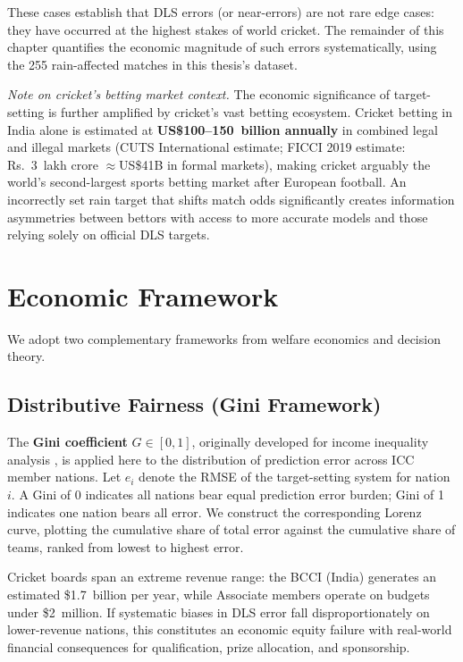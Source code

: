 \documentclass[12pt,a4paper,oneside]{report}
\begin{document}
\medskip
These cases establish that DLS errors (or near-errors) are not rare edge cases: they have occurred at the highest stakes of world cricket.  The remainder of this chapter quantifies the economic magnitude of such errors systematically, using the 255 rain-affected matches in this thesis's dataset.

\medskip
\noindent\textit{Note on cricket's betting market context.}  The economic significance of target-setting is further amplified by cricket's vast betting ecosystem.  Cricket betting in India alone is estimated at \textbf{US\$100--150~billion annually} in combined legal and illegal markets (CUTS International estimate; FICCI 2019 estimate: Rs.\ 3~lakh crore $\approx$US\$41B in formal markets), making cricket arguably the world's second-largest sports betting market after European football.  An incorrectly set rain target that shifts match odds significantly creates information asymmetries between bettors with access to more accurate models and those relying solely on official DLS targets.

\section{Economic Framework}
\label{sec:econ_framework}

We adopt two complementary frameworks from welfare economics and decision theory.

\subsection{Distributive Fairness (Gini Framework)}

The \textbf{Gini coefficient} $G \in [0,1]$, originally developed for income inequality analysis \citep{Gini1912}, is applied here to the distribution of prediction error across ICC member nations.  Let $e_i$ denote the RMSE of the target-setting system for nation $i$.  A Gini of 0 indicates all nations bear equal prediction error burden; Gini of 1 indicates one nation bears all error.  We construct the corresponding Lorenz curve, plotting the cumulative share of total error against the cumulative share of teams, ranked from lowest to highest error.

Cricket boards span an extreme revenue range: the BCCI (India) generates an estimated \$1.7~billion per year, while Associate members operate on budgets under \$2~million.  If systematic biases in DLS error fall disproportionately on lower-revenue nations, this constitutes an economic equity failure with real-world financial consequences for qualification, prize allocation, and sponsorship.
\end{document}
